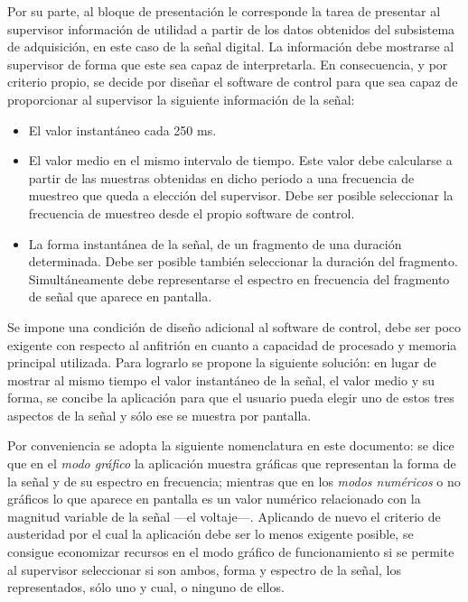 Por su parte, al bloque de presentación le corresponde la tarea de presentar al supervisor información de utilidad a partir de los datos obtenidos del subsistema de adquisición, en este caso de la señal digital. La información debe mostrarse al supervisor de forma que este sea capaz de interpretarla. En consecuencia, y por criterio propio, se decide por diseñar el software de control para que sea capaz de proporcionar al supervisor la siguiente información de la señal:

\begin{itemize}
	\item El valor instantáneo cada 250 ms.
	\item El valor medio en el mismo intervalo de tiempo. Este valor debe calcularse a partir de las muestras obtenidas en dicho periodo a una frecuencia de muestreo que queda a elección del supervisor. Debe ser posible seleccionar la frecuencia de muestreo desde el propio software de control.
	\item La forma instantánea de la señal, de un fragmento de una duración determinada. Debe ser posible también seleccionar la duración del fragmento. Simultáneamente debe representarse el espectro en frecuencia del fragmento de señal que aparece en pantalla.
\end{itemize}

Se impone una condición de diseño adicional al software de control, debe ser poco exigente con respecto al \pc{} anfitrión en cuanto a capacidad de procesado y memoria principal utilizada. Para lograrlo se propone la siguiente solución: en lugar de mostrar al mismo tiempo el valor instantáneo de la señal, el valor medio y su forma, se concibe la aplicación para que el usuario pueda elegir uno de estos tres aspectos de la señal y sólo ese se muestra por pantalla.\par
Por conveniencia se adopta la siguiente nomenclatura en este documento: se dice que en el \emph{modo gráfico} la aplicación muestra gráficas que representan la forma de la señal y de su espectro en frecuencia; mientras que en los \emph{modos numéricos} o no gráficos lo que aparece en pantalla es un valor numérico relacionado con la magnitud variable de la señal ---el voltaje---. Aplicando de nuevo el criterio de austeridad por el cual la aplicación debe ser lo menos exigente posible, se consigue economizar recursos en el modo gráfico de funcionamiento si se permite al supervisor seleccionar si son ambos, forma y espectro de la señal, los representados, sólo uno y cual, o ninguno de ellos.


